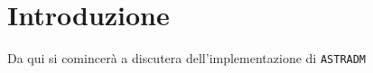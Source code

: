 \chapter{Introduzione}
Da qui si comincerà a discutera dell'implementazione di
\texttt{ASTRADM}





